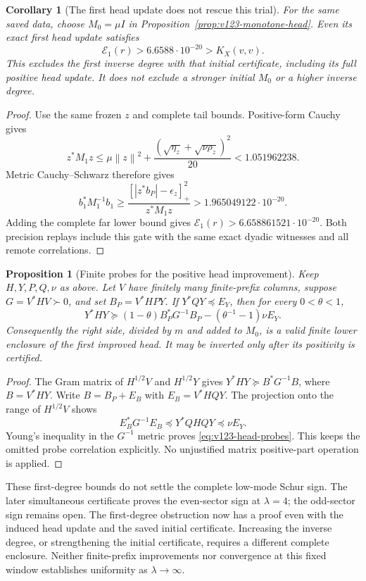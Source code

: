 \documentclass[11pt]{article}
\newtheorem{proposition}[theorem]{Proposition}
\newtheorem{corollary}[theorem]{Corollary}
\theoremstyle{remark}
\newcommand{\norm}[1]{\left\lVert #1\right\rVert}
\begin{document}
\begin{corollary}[The first head update does not rescue this trial]
\label{cor:v123-updated-first-fails}
For the same saved data, choose $M_0=\mu I$ in
Proposition~\ref{prop:v123-monotone-head}. Even its exact first
head update satisfies
\[
 \mathcal E_1(r)>6.6588\cdot10^{-20}>K_X(v,v).
\]
This excludes the first inverse degree with that initial certificate,
including its full positive head update. It does not exclude a
stronger initial $M_0$ or a higher inverse degree.
\end{corollary}
\begin{proof}
Use the same frozen $z$ and complete tail bounds. Positive-form
Cauchy gives
\[
 z^*M_1z\le\mu\norm z^2+
 \frac{(\sqrt{\eta_z}+\sqrt{\nu\rho_z})^2}{20}
       <1.051962238.
\]
Metric Cauchy--Schwarz therefore gives
\[
 b_1^*M_1^{-1}b_1
 \ge\frac{[|z^*b_P|-\epsilon_z]_+^2}{z^*M_1z}
       >1.965049122\cdot10^{-20}.
\]
Adding the complete far lower bound gives
$\mathcal E_1(r)>6.658861521\cdot10^{-20}$.
Both precision replays include this gate with the same exact
dyadic witnesses and all remote correlations.
\end{proof}

\begin{proposition}[Finite probes for the positive head improvement]
\label{prop:v123-head-probes}
Keep $H,Y,P,Q,\nu$ as above. Let $V$ have finitely many
finite-prefix columns, suppose $G=V^*HV\succ0$, and set
$B_P=V^*HPY$. If $Y^*QY\preceq E_Y$, then for every
$0<\theta<1$,
\begin{equation}\label{eq:v123-head-probes}
 Y^*HY\succeq
 (1-\theta)B_P^*G^{-1}B_P
       -(\theta^{-1}-1)\nu E_Y.
\end{equation}
Consequently the right side, divided by $m$ and added to $M_0$,
is a valid finite lower enclosure of the first improved head.
It may be inverted only after its positivity is certified.
\end{proposition}
\begin{proof}
The Gram matrix of $H^{1/2}V$ and $H^{1/2}Y$ gives
$Y^*HY\succeq B^*G^{-1}B$, where $B=V^*HY$.
Write $B=B_P+E_B$ with $E_B=V^*HQY$.
The projection onto the range of $H^{1/2}V$ shows
\[
 E_B^*G^{-1}E_B\preceq Y^*QHQY\preceq\nu E_Y.
\]
Young's inequality in the $G^{-1}$ metric proves
\eqref{eq:v123-head-probes}. This keeps the omitted probe
correlation explicitly. No unjustified matrix positive-part
operation is applied.
\end{proof}

These first-degree bounds do not settle the complete low-mode Schur
sign. The later simultaneous certificate proves the even-sector sign
at $\lambda=4$; the odd-sector sign remains open.
The first-degree obstruction now has a proof even with the
induced head update and the saved initial certificate. Increasing
the inverse degree, or strengthening the initial certificate,
requires a different complete enclosure.
Neither finite-prefix improvements nor convergence at this fixed
window establishes uniformity as $\lambda\to\infty$.
\end{document}
